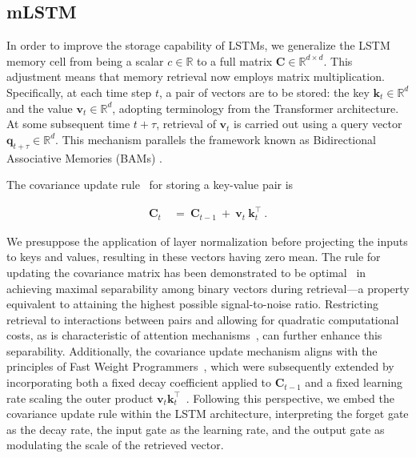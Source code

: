 \subsection{mLSTM}
\label{sec:mLSTM}

In order to improve the storage capability of LSTMs, we generalize the LSTM memory cell from being a scalar $c \in \mathbb{R}$ to a full matrix $\mathbf{C} \in \mathbb{R}^{d \times d}$. This adjustment means that memory retrieval now employs matrix multiplication. Specifically, at each time step $t$, a pair of vectors are to be stored: the key $\mathbf{k}_t \in \mathbb{R}^d$ and the value $\mathbf{v}_t \in \mathbb{R}^d$, adopting terminology from the Transformer architecture. At some subsequent time $t + \tau$, retrieval of $\mathbf{v}_t$ is carried out using a query vector $\mathbf{q}_{t+\tau} \in \mathbb{R}^d$. This mechanism parallels the framework known as Bidirectional Associative Memories (BAMs) \citep{Kohonen:72,Anderson:72,Nakano:72,Anderson:77}.

The covariance update rule~\citep{Sejnowski:77,Dayan:91} for storing a key-value pair is

\begin{align}
\mathbf{C}_t \ &= \ \mathbf{C}_{t-1} \ + \ \mathbf{v}_{t} \ \mathbf{k}_t^\top \ .
\end{align}

We presuppose the application of layer normalization before projecting the inputs to keys and values, resulting in these vectors having zero mean. The rule for updating the covariance matrix has been demonstrated to be optimal~\citep{Dayan:91} in achieving maximal separability among binary vectors during retrieval—a property equivalent to attaining the highest possible signal-to-noise ratio. Restricting retrieval to interactions between pairs and allowing for quadratic computational costs, as is characteristic of attention mechanisms~\citep{Krotov:16,Krotov:17,Ramsauer:21}, can further enhance this separability. Additionally, the covariance update mechanism aligns with the principles of Fast Weight Programmers~\citep{Schmidhuber:92ncfastweights,Schlag:21}, which were subsequently extended by incorporating both a fixed decay coefficient applied to $\mathbf{C}_{t-1}$ and a fixed learning rate scaling the outer product $\mathbf{v}_{t} \mathbf{k}_t ^\top$~\citep{Ba:16}. Following this perspective, we embed the covariance update rule within the LSTM architecture, interpreting the forget gate as the decay rate, the input gate as the learning rate, and the output gate as modulating the scale of the retrieved vector.


